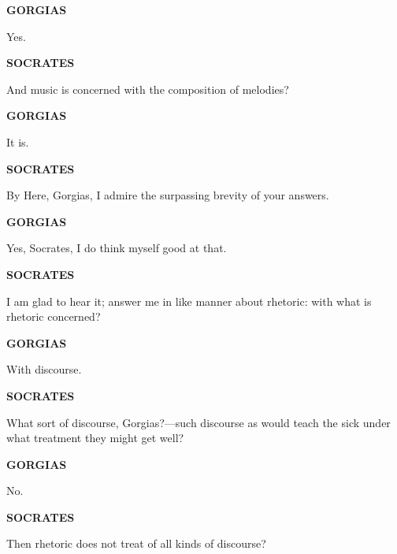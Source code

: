 \documentclass[11pt,letter]{article}
\begin{document}
\par \textbf{GORGIAS}
\par   Yes.

\par \textbf{SOCRATES}
\par   And music is concerned with the composition of melodies?

\par \textbf{GORGIAS}
\par   It is.

\par \textbf{SOCRATES}
\par   By Here, Gorgias, I admire the surpassing brevity of your answers.

\par \textbf{GORGIAS}
\par   Yes, Socrates, I do think myself good at that.

\par \textbf{SOCRATES}
\par   I am glad to hear it; answer me in like manner about rhetoric:  with what is rhetoric concerned?

\par \textbf{GORGIAS}
\par   With discourse.

\par \textbf{SOCRATES}
\par   What sort of discourse, Gorgias?—such discourse as would teach the sick under what treatment they might get well?

\par \textbf{GORGIAS}
\par   No.

\par \textbf{SOCRATES}
\par   Then rhetoric does not treat of all kinds of discourse?

\par \textbf{GORGIAS}
\par   Certainly not.

\par \textbf{SOCRATES}
\par   And yet rhetoric makes men able to speak?

\par \textbf{GORGIAS}
\par   Yes.

\par \textbf{SOCRATES}
\par   And to understand that about which they speak?
\end{document}
